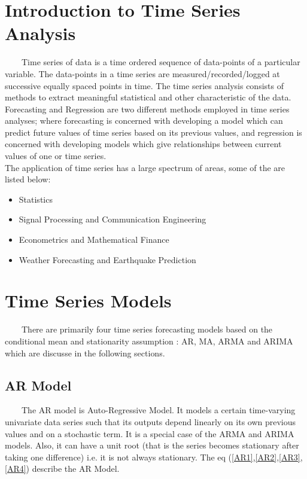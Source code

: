 
\section{Introduction to Time Series Analysis}
\
\
\
\
Time series of data is a time ordered sequence of data-points of a particular variable. The data-points in a time series are measured/recorded/logged at successive equally spaced points in time. The time series analysis consists of methods to extract meaningful statistical and other characteristic of the data. Forecasting and Regression are two different methods employed in time series analyses;  where forecasting is concerned with developing a model which can predict future values of time series based on its previous values, and regression is concerned with developing models which give relationships between  current values of one or time series.\\

The application of time series has a large spectrum of areas, some of the are listed below:

\begin{itemize}

\item Statistics

\item Signal Processing and Communication Engineering

\item Econometrics and Mathematical Finance

\item Weather Forecasting and Earthquake Prediction

\end{itemize} 

\section{Time Series Models}
\
\
\
\
There are primarily four time series forecasting models based on the conditional mean and stationarity assumption : AR, MA, ARMA and ARIMA which are discusse in the following sections.

\subsection{AR Model}
\
\
\
\
The AR model is Auto-Regressive Model. It models a certain time-varying univariate data series such that its outputs depend linearly on its own previous values and on a stochastic term. It is a special case of the ARMA and ARIMA models. Also, it can have a unit root (that is the series becomes stationary after taking one difference) i.e. it is not always stationary. The eq (\ref{AR1},\ref{AR2},\ref{AR3},\ref{AR4}) describe the AR Model.

